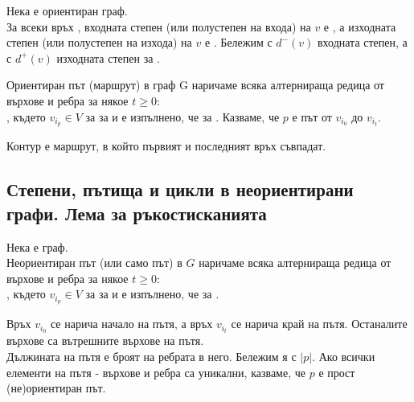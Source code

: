 \begin{definition}
    Нека \graf е ориентиран граф. \\
    За всеки връх , входната степен (или полустепен на входа) на \(v\) е 
    , а изходната степен (или полустепен на изхода) на \(v\) е
    . Бележим с \(d^-(v)\) входната степен, а с \(d^+(v)\) 
    изходната степен за .
\end{definition}

\begin{definition}
    Ориентиран път (маршрут) в граф G наричаме всяка алтернираща редица от върхове и ребра за някое \(t \ge 0\): \\
    , където 
    \(v_{i_p} \in V\) за  за  и е изпълнено, че 
     за . Казваме, че \(p\) е път 
    от \(v_{i_0}\) до \(v_{i_t}\).
\end{definition}

\begin{definition}
    Контур е маршрут, в който първият и последният връх съвпадат.
\end{definition}

\subsection*{Степени, пътища и цикли в неориентирани графи. Лема за ръкостисканията}

\begin{definition}
    Нека \graf е граф. \\
    Неориентиран път (или само път) в \(G\) наричаме всяка алтернираща редица от върхове и ребра за 
    някое \(t \ge 0\): \\
    , където 
    \(v_{i_p} \in V\) за  за  и е изпълнено, че 
     за .
\end{definition}

\begin{note}
    Връх \(v_{i_0}\) се нарича начало на пътя, а връх \(v_{i_t}\) се нарича край на пътя. Останалите 
    върхове са вътрешните върхове на пътя. \\
    Дължината на пътя е броят на ребрата в него. Бележим я с \(|p|\).
    Ако всички елементи на пътя - върхове и ребра са уникални, казваме, че \(p\) е прост (не)ориентиран път.
\end{note}

